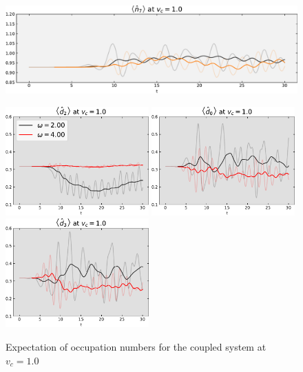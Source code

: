 \begin{figure}[!hbt]
\begin{minipage}[b]{.49\textwidth}
                \includegraphics[trim=0 0 0 -4, clip, width=1.00\textwidth]{graph/occupation/occupation_site_7_vc_10.pdf}
       \caption{Expectation of occupation numbers for the coupled system at $v_c = 1.0$}
        \label{fig:occupation_vc_10}
    \end{minipage}
    \hfill
    \begin{minipage}[b]{.49\textwidth}
                \centering
                \includegraphics[width=0.49\textwidth]{graph/double_occupation/double_occupation_vc_10_site_2.pdf}
                \includegraphics[width=0.49\textwidth]{graph/double_occupation/double_occupation_vc_10_site_0.pdf}
                \includegraphics[width=0.49\textwidth]{graph/double_occupation/double_occupation_vc_10_site_3.pdf}

\end{minipage}
\end{figure}
